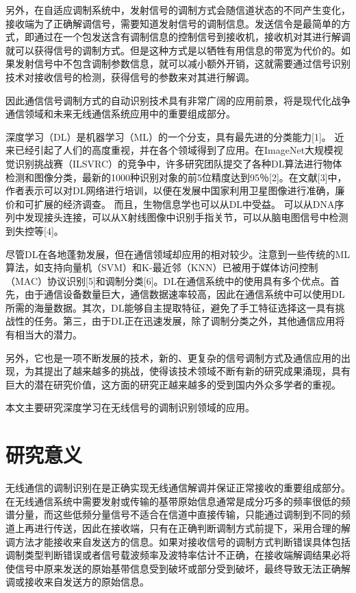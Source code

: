 另外，在自适应调制系统中，发射信号的调制方式会随信道状态的不同产生变化，接收端为了正确解调信号，需要知道发射信号的调制信息。发送信令是最简单的方式，即通过在一个包发送含有调制信息的控制信号到接收机，接收机对其进行解调就可以获得信号的调制方式。但是这种方式是以牺牲有用信息的带宽为代价的。如果发射信号中不包含调制参数信息，就可以减小额外开销，这就需要通过信号识别技术对接收信号的检测，获得信号的参数来对其进行解调。\par

因此通信信号调制方式的自动识别技术具有非常广阔的应用前景，将是现代化战争通信领域和未来无线通信系统应用中的重要组成部分。\par

深度学习（DL）是机器学习（ML）的一个分支，具有最先进的分类能力[1]。 近来已经引起了人们的高度重视，并在各个领域得到了应用。在ImageNet大规模视觉识别挑战赛（ILSVRC）的竞争中，许多研究团队提交了各种DL算法进行物体检测和图像分类，最新的1000种识别对象的前5位精度达到95％[2]。在文献[3]中，作者表示可以对DL网络进行培训，以便在发展中国家利用卫星图像进行准确，廉价和可扩展的经济调查。 而且，生物信息学也可以从DL中受益。 可以从DNA序列中发现接头连接，可以从X射线图像中识别手指关节，可以从脑电图信号中检测到失控等[4]。\par

尽管DL在各地蓬勃发展，但在通信领域却应用的相对较少。注意到一些传统的ML算法，如支持向量机（SVM）和K-最近邻（KNN）已被用于媒体访问控制（MAC）协议识别[5]和调制分类[6]。DL在通信系统中的使用具有多个优点。首先，由于通信设备数量巨大，通信数据速率较高，因此在通信系统中可以使用DL所需的海量数据。其次，DL能够自主提取特征，避免了手工特征选择这一具有挑战性的任务。第三，由于DL正在迅速发展，除了调制分类之外，其他通信应用将有相当大的潜力。\par

另外，它也是一项不断发展的技术，新的、更复杂的信号调制方式及通信应用的出现，为其提出了越来越多的挑战，使得该技术领域不断有新的研究成果涌现，具有巨大的潜在研究价值，这方面的研究正越来越多的受到国内外众多学者的重视。\par

本文主要研究深度学习在无线信号的调制识别领域的应用。\par


\section{研究意义}

无线通信的调制识别在是正确实现无线通信解调并保证正常接收的重要组成部分。在无线通信系统中需要发射或传输的基带原始信息通常是成分巧多的频率很低的频谱分量，而这些低频分量信号不适合在信道中直接传输，只能通过调制到不同的频道上再进行传送，因此在接收端，只有在正确判断调制方式前提下，采用合理的解调方法才能接收来自发送方的信息。如果对接收信号的调制方式判断错误具体包括调制类型判断错误或者信号载波频率及波特率估计不正确，在接收端解调结果必将使信号中原来发送的原始基带信息受到破坏或部分受到破坏，最终导致无法正确解调或接收来自发送方的原始信息。\par

